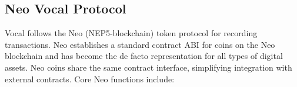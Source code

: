 \documentclass[conference]{IEEEtran}
\begin{document}
    \subsection{Neo Vocal Protocol}
   Vocal follows the Neo (NEP5-blockchain) token protocol for recording transactions.
    Neo establishes a standard contract ABI for coins on the Neo blockchain and has become the de facto representation for all types of digital assets. Neo coins share the same contract interface, simplifying integration with external contracts.
    Core Neo functions include:

    
    \printbibliography
   
    
\end{document}
